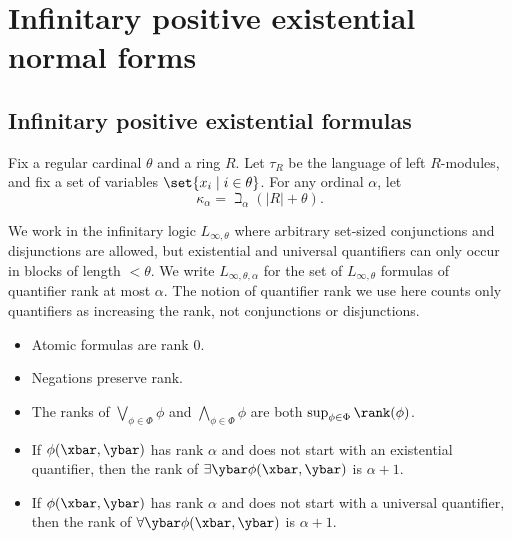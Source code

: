 \documentclass[11pt]{article}
\begin{document}
\section{Infinitary positive existential normal forms}

\subsection{Infinitary positive existential formulas}

Fix a regular cardinal $\theta$ and a ring $R$. Let $\tau_R$ be the language of left $R$-modules, and fix a set of variables $\set{x_i \mid i \in \theta}$. For any ordinal $\alpha$, let 
\[ \kappa_\alpha = \beth_\alpha(|R| + \theta). \]

We work in the infinitary logic $L_{\infty,\theta}$ where arbitrary set-sized conjunctions and disjunctions are allowed, but existential and universal quantifiers can only occur in blocks of length $< \theta$. We write $L_{\infty,\theta,\alpha}$ for the set of $L_{\infty,\theta}$ formulas of quantifier rank at most $\alpha$. The notion of quantifier rank we use here counts only quantifiers as increasing the rank, not conjunctions or disjunctions.
\begin{itemize}
    \item Atomic formulas are rank $0$.

    \item Negations preserve rank.

    \item The ranks of $\bigvee_{\phi \in \Phi} \phi$ and $\bigwedge_{\phi \in \Phi} \phi$ are both $\sup_{\phi \in \Phi} \rank(\phi)$.

    \item If $\phi(\xbar,\ybar)$ has rank $\alpha$ and does not start with an existential quantifier, then the rank of $\exists \ybar \phi(\xbar,\ybar)$ is $\alpha + 1$.

    \item If $\phi(\xbar,\ybar)$ has rank $\alpha$ and does not start with a universal quantifier, then the rank of $\forall \ybar \phi(\xbar,\ybar)$ is $\alpha + 1$.
\end{itemize}
\end{document}
